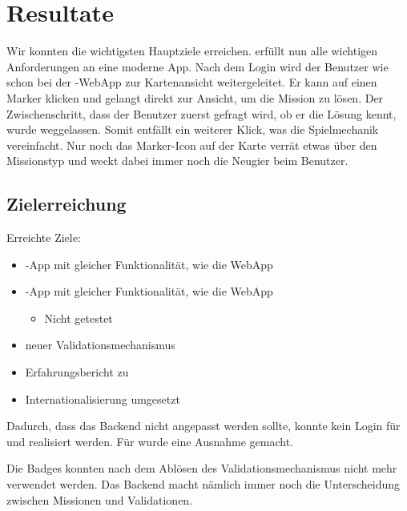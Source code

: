 \chapter{Resultate}
\label{tb-resultate}

Wir konnten die wichtigsten Hauptziele erreichen.
\kort{} erfüllt nun alle wichtigen Anforderungen an eine moderne App.
Nach dem Login wird der Benutzer wie schon bei der \kort{}-\gls{WebApp} zur Kartenansicht weitergeleitet.
Er kann auf einen Marker klicken und gelangt direkt zur Ansicht, um die Mission zu lösen.
Der Zwischenschritt, dass der Benutzer zuerst gefragt wird, ob er die Lösung kennt, wurde weggelassen.
Somit entfällt ein weiterer Klick, was die Spielmechanik vereinfacht.
Nur noch das Marker-Icon auf der Karte verrät etwas über den Missionstyp und weckt dabei immer noch die Neugier beim Benutzer.


\section{Zielerreichung}
Erreichte Ziele:



\begin{itemize}
	\item {}-App mit gleicher Funktionalität, wie die \gls{WebApp}
	\item {}-App mit gleicher Funktionalität, wie die \gls{WebApp}
	\begin{itemize}
		\item Nicht getestet
	\end{itemize}
	\item neuer Validationsmechanismus
	\item Erfahrungsbericht zu 
	\item Internationalisierung umgesetzt
\end{itemize}

Dadurch, dass das Backend nicht angepasst werden sollte, konnte kein Login für  und  realisiert werden.
Für  wurde eine Ausnahme gemacht.

Die Badges konnten nach dem Ablösen des Validationsmechanismus nicht mehr verwendet werden.
Das Backend macht nämlich immer noch die Unterscheidung zwischen Missionen und Validationen.

